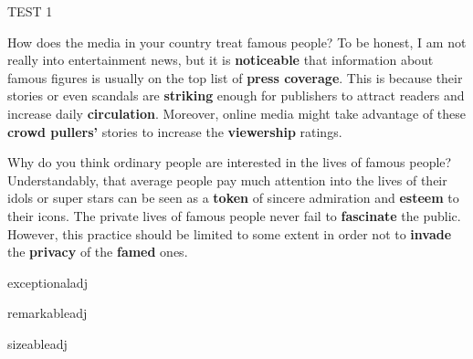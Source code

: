\begin{glossarymc}[Cambridge 5]
\begin{test}{TEST 1}
    \begin{qa}{How does the media in your country treat famous people?}
    To be honest, I am not really into entertainment news, but it is \textbf{noticeable} that information about famous figures is usually on the top list of \textbf{press coverage}. This is because their stories or even scandals are \textbf{striking} enough for publishers to attract readers and increase daily \textbf{circulation}. Moreover, online media might take advantage of these \textbf{crowd pullers’} stories to increase the \textbf{viewership} ratings.
    \end{qa}

    \begin{qa}{Why do you think ordinary people are interested in the lives of famous people?}
    Understandably, that average people pay much attention into the lives of their idols or super stars can be seen as a \textbf{token} of sincere admiration and \textbf{esteem} to their icons. The private lives of famous people never fail to \textbf{fascinate} the public. However, this practice should be limited to some extent in order not to \textbf{invade} the \textbf{privacy} of the \textbf{famed} ones.
    \end{qa}

    \begin{VocabExplain}[Part 3]
        \begin{ExplainCard}{exceptional}{adj}
        \end{ExplainCard}

        \begin{ExplainCard}{remarkable}{adj}
        \end{ExplainCard}

        \begin{ExplainCard}{sizeable}{adj}
        \end{ExplainCard}


\end{VocabExplain}
\end{test}
\end{glossarymc}
